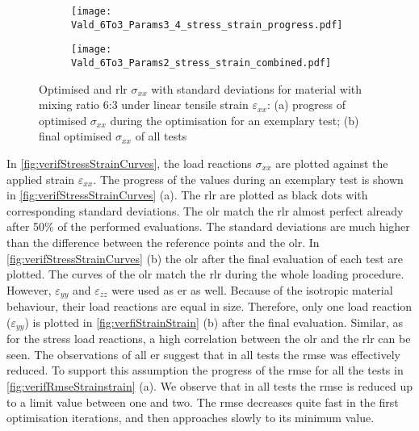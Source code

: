 \begin{figure}[H]
\centering
\begin{subfigure}[t]{0.495\textwidth}
    \centering
    \texttt{[image: Vald\_6To3\_Params3\_4\_stress\_strain\_progress.pdf]}
    \caption{}
    \label{fig:verifStressStrainProgress}
\end{subfigure}
\hfill
\begin{subfigure}[t]{0.495\textwidth}
    \centering
    \texttt{[image: Vald\_6To3\_Params2\_stress\_strain\_combined.pdf]}
    \caption{}
    \label{fig:verifStressStrainFinal}
\end{subfigure}
\caption{Optimised and \acrfull{rlr} $\sigma_{xx}$ with standard deviations for material with mixing ratio 6:3 under linear tensile strain $\varepsilon_{xx}$: (a) progress of optimised $\sigma_{xx}$ during the optimisation for an exemplary test; (b) final optimised $\sigma_{xx}$ of all tests}
\label{fig:verifStressStrainCurves}
\end{figure}

In \autoref{fig:verifStressStrainCurves}, the load reactions $\sigma_{xx}$ are plotted against the applied strain $\varepsilon_{xx}$. The progress of the values during an exemplary test is shown in \autoref{fig:verifStressStrainCurves} (a). The \acrlong{rlr} are plotted as black dots with corresponding standard deviations. The \acrlong{olr} match the \acrlong{rlr} almost perfect already after 50\% of the performed evaluations. The standard deviations are much higher than the difference between the reference points and the \acrlong{olr}. In \autoref{fig:verifStressStrainCurves} (b) the \acrlong{olr} after the final evaluation of each test are plotted.
The curves of the \acrlong{olr} match the \acrlong{rlr} during the whole loading procedure.
However, $\varepsilon_{yy}$ and $\varepsilon_{zz}$ were used as \acrlong{er} as well. Because of the isotropic material behaviour, their load reactions are equal in size. Therefore, only one load reaction ($\varepsilon_{yy}$) is plotted in \autoref{fig:verfiStrainStrain} (b) after the final evaluation. Similar, as for the stress load reactions, a high correlation between the \acrlong{olr} and the \acrlong{rlr} can be seen. The observations of all \acrlong{er} suggest that in all tests the \acrshort{rmse} was effectively reduced. To support this assumption the progress of the \acrshort{rmse} for all the tests in \autoref{fig:verifRmseStrainstrain} (a). We observe that in all tests the \acrshort{rmse} is reduced up to a limit value between one and two. The \acrshort{rmse} decreases quite fast in the first optimisation iterations, and then approaches slowly to its minimum value.

